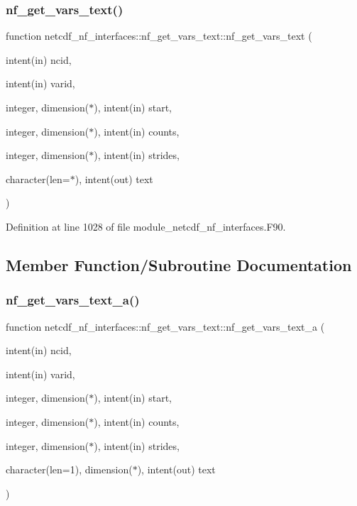 \subsubsection{\texorpdfstring{nf\+\_\+get\+\_\+vars\+\_\+text()}{nf\_get\_vars\_text()}}
{\footnotesize\ttfamily function netcdf\+\_\+nf\+\_\+interfaces\+::nf\+\_\+get\+\_\+vars\+\_\+text\+::nf\+\_\+get\+\_\+vars\+\_\+text (\begin{DoxyParamCaption}\item[{intent(in)}]{ncid,  }\item[{intent(in)}]{varid,  }\item[{integer, dimension($\ast$), intent(in)}]{start,  }\item[{integer, dimension($\ast$), intent(in)}]{counts,  }\item[{integer, dimension($\ast$), intent(in)}]{strides,  }\item[{character(len=$\ast$), intent(out)}]{text }\end{DoxyParamCaption})}



Definition at line 1028 of file module\+\_\+netcdf\+\_\+nf\+\_\+interfaces.\+F90.



\subsection{Member Function/\+Subroutine Documentation}
\mbox{\label{interfacenetcdf__nf__interfaces_1_1nf__get__vars__text_a960b35b1ab5f8b6fd472da3804bf9366}} 
\subsubsection{\texorpdfstring{nf\+\_\+get\+\_\+vars\+\_\+text\+\_\+a()}{nf\_get\_vars\_text\_a()}}
{\footnotesize\ttfamily function netcdf\+\_\+nf\+\_\+interfaces\+::nf\+\_\+get\+\_\+vars\+\_\+text\+::nf\+\_\+get\+\_\+vars\+\_\+text\+\_\+a (\begin{DoxyParamCaption}\item[{intent(in)}]{ncid,  }\item[{intent(in)}]{varid,  }\item[{integer, dimension($\ast$), intent(in)}]{start,  }\item[{integer, dimension($\ast$), intent(in)}]{counts,  }\item[{integer, dimension($\ast$), intent(in)}]{strides,  }\item[{character(len=1), dimension($\ast$), intent(out)}]{text }\end{DoxyParamCaption})}



